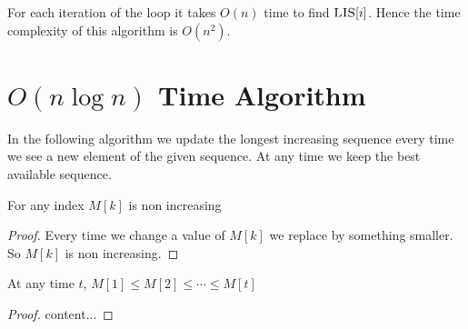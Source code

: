 For each iteration of the loop it takes $O(n)$ time to find $\textsc{LIS}[i]$. Hence the time complexity of this algorithm is $O(n^2)$. 
\section{$O(n\log n)$ Time Algorithm}
In the following algorithm we update the longest increasing sequence every time we see a new element of the given sequence. At any time we keep the best available sequence.
\begin{algorithm}
	\DontPrintSemicolon
\caption{$(A)$}
\end{algorithm}

\begin{lemma}{}{}
	For any index $M[k]$ is non increasing
\end{lemma}
\begin{proof}
	Every time we change a value of $M[k]$ we replace by something smaller. So $M[k]$ is non increasing.
\end{proof}

\begin{lemma}{}{}
At any time $t$, $M[1]\leq M[2]\leq \cdots\leq M[t]$
\end{lemma}
\begin{proof}
content...
\end{proof}
